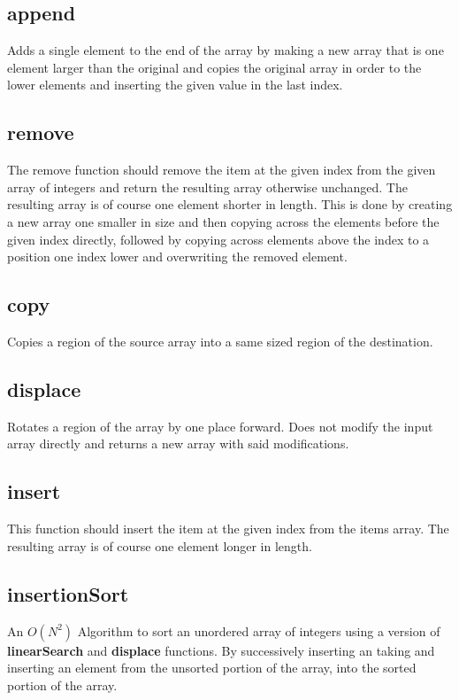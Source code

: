 \documentclass[10pt]{article} %
\begin{document}
\subsection{append}
Adds a single element to the end of the array by making a new array that is one element larger than the original and copies the original array in order to the lower elements and inserting the given value in the last index.

\subsection{remove}
The remove function should remove the item at the given index from the given array of integers and return the resulting array otherwise unchanged. The resulting array is of course one element shorter in length. This is done by creating a new array one smaller in size and then copying across the elements before the given index directly, followed by copying across elements above the index to a position one index lower and overwriting the removed element.

\subsection{copy}
Copies a region of the source array into a same sized region of the destination. 

\subsection{displace}
Rotates a region of the array by one place forward. Does not modify the input array directly and returns a new array with said modifications.

\subsection{insert}
This function should insert the item at the given index from the items array.  The resulting array is of course one element longer in length.

\subsection{insertionSort}
An $O(N^2)$ Algorithm to sort an unordered array of integers using a version of  \textbf{linearSearch} and  \textbf{displace} functions. By successively inserting an taking and inserting an element from the unsorted portion of the array, into the sorted portion of the array.
\end{document}
